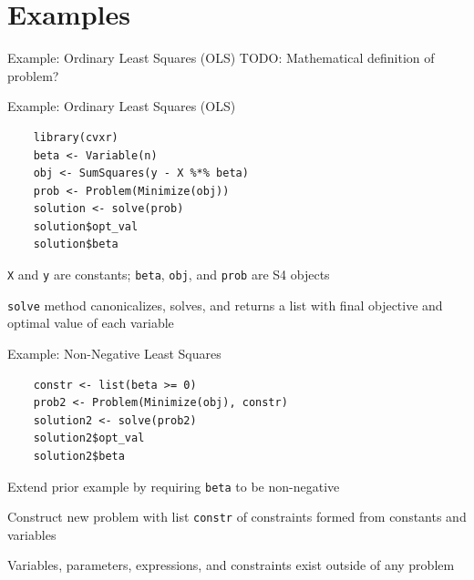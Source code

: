 \documentclass{beamer}
\begin{document}
\section{Examples}

\begin{frame}{Example: Ordinary Least Squares (OLS)}
	TODO: Mathematical definition of problem?
\end{frame}

\begin{frame}[fragile]{Example: Ordinary Least Squares (OLS)}
	\begin{verbatim}
	library(cvxr)
	beta <- Variable(n)
	obj <- SumSquares(y - X %*% beta)
	prob <- Problem(Minimize(obj))
	solution <- solve(prob)
	solution$opt_val
	solution$beta
	\end{verbatim}
	
	\BIT
		\item \verb|X| and \verb|y| are constants; \verb|beta|, \verb|obj|, and \verb|prob| are S4 objects
		\item \verb|solve| method canonicalizes, solves, and returns a list with final objective and optimal value of each variable
	\EIT
\end{frame}

\begin{frame}[fragile]{Example: Non-Negative Least Squares}
	\begin{verbatim}
	constr <- list(beta >= 0)
	prob2 <- Problem(Minimize(obj), constr)
	solution2 <- solve(prob2)
	solution2$opt_val
	solution2$beta
	\end{verbatim}
	
	\BIT
		\item Extend prior example by requiring \verb|beta| to be non-negative
		\item Construct new problem with list \verb|constr| of constraints formed from constants and variables
		\item Variables, parameters, expressions, and constraints exist outside of any problem
	\EIT
\end{frame}
\end{document}
